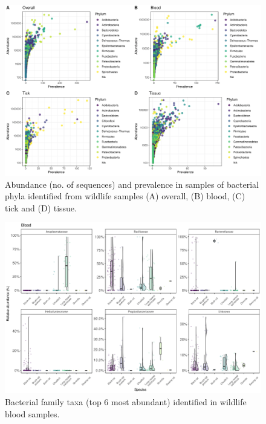 \documentclass[a4paper, nobind]{templates/ociamthesis}
\begin{document}
\newpage

\begin{figure}
\includegraphics[width=0.95\linewidth]{figures/ms-figs-appendix/FigA-3.5} \caption[Phylum level taxa abundance]{Abundance (no. of sequences) and prevalence in samples of bacterial phyla identified from wildlife samples (A) overall, (B) blood, (C) tick and (D) tissue.}\label{fig:FA35}
\end{figure}

\newpage

\begin{figure}
\includegraphics[width=0.8\linewidth]{figures/ms-figs-appendix/FigA-3.6} \caption[Bacterial family taxa identified in wildlife blood samples]{Bacterial family taxa (top 6 most abundant) identified in wildlife blood samples.}\label{fig:FA36}
\end{figure}

\newpage
\end{document}
